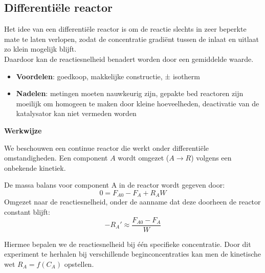 \documentclass{ximera}
\begin{document}
\subsection*{Differentiële reactor}

Het idee van een differentiële reactor is om de reactie slechts in zeer beperkte mate te laten verlopen, zodat de concentratie gradiënt tussen de inlaat en uitlaat zo klein mogelijk blijft.\\
Daardoor kan de reactiesnelheid benadert worden door een gemiddelde waarde.

\begin{center}
\end{center}

\begin{itemize}
    \item \textbf{Voordelen}: goedkoop, makkelijke constructie, ± isotherm 
    \item \textbf{Nadelen}: metingen moeten nauwkeurig zijn, gepakte bed reactoren zijn moeilijk om homogeen te maken door kleine hoeveelheden, deactivatie van de katalysator kan niet vermeden worden 
\end{itemize}

\textbf{Werkwijze}

We beschouwen een continue reactor die werkt onder differentiële omstandigheden. Een component $A$ wordt omgezet ($A \rightarrow R$) volgens een onbekende kinetiek.

De massa balans voor component A in de reactor wordt gegeven door:
\[
0 = F_{A0} - F_A + R_AW
\]
Omgezet naar de reactiesnelheid, onder de aanname dat deze doorheen de reactor constant blijft:
\[
-R_A' \approx \frac{F_{A0} - F_A}{W}
\]

Hiermee bepalen we de reactiesnelheid bij één specifieke concentratie. Door dit experiment te herhalen bij verschillende beginconcentraties kan men de kinetische wet $R_A = f(C_A)$ opstellen.
\end{document}
